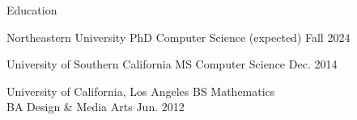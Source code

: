 \documentclass[]{cv}
\begin{document}
\resumeheader
{}
{}
{}
{}

\begin{section}{Education}
    \begin{subsectionnobullet}
        {Northeastern University}
        {PhD Computer Science}
        {(expected) Fall 2024}
    \end{subsectionnobullet}
    
    \begin{subsectionnobullet}
        {University of Southern California}
        {MS Computer Science}
        {Dec. 2014}
    \end{subsectionnobullet}

    \begin{subsectionnobullet}
        {University of California, Los Angeles}
        {BS Mathematics\\ BA Design \& Media Arts}
        {Jun. 2012}
    \end{subsectionnobullet}
\end{section}
\end{document}
